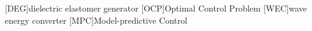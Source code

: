 \begin{acronym}
	[DEG]{dielectric elastomer generator}
	[OCP]{Optimal Control Problem}
	[WEC]{wave energy converter}
	[MPC]{Model-predictive Control}
\end{acronym}